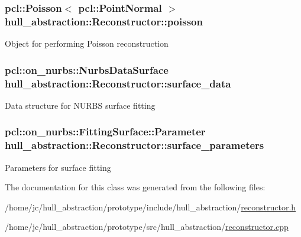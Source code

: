 \subsubsection[{\texorpdfstring{poisson}{poisson}}]{\setlength{\rightskip}{0pt plus 5cm}pcl\+::\+Poisson$<$ pcl\+::\+Point\+Normal $>$ hull\+\_\+abstraction\+::\+Reconstructor\+::poisson\hspace{0.3cm}{\ttfamily [private]}}\hypertarget{classhull__abstraction_1_1_reconstructor_a60dfa765833af8d05f1426be0e96adb0}{}\label{classhull__abstraction_1_1_reconstructor_a60dfa765833af8d05f1426be0e96adb0}
Object for performing Poisson reconstruction 
\subsubsection[{\texorpdfstring{surface\+\_\+data}{surface_data}}]{\setlength{\rightskip}{0pt plus 5cm}pcl\+::on\+\_\+nurbs\+::\+Nurbs\+Data\+Surface hull\+\_\+abstraction\+::\+Reconstructor\+::surface\+\_\+data\hspace{0.3cm}{\ttfamily [private]}}\hypertarget{classhull__abstraction_1_1_reconstructor_a54297518de25118c2c44b5d8b778f65a}{}\label{classhull__abstraction_1_1_reconstructor_a54297518de25118c2c44b5d8b778f65a}
Data structure for N\+U\+R\+BS surface fitting 
\subsubsection[{\texorpdfstring{surface\+\_\+parameters}{surface_parameters}}]{\setlength{\rightskip}{0pt plus 5cm}pcl\+::on\+\_\+nurbs\+::\+Fitting\+Surface\+::\+Parameter hull\+\_\+abstraction\+::\+Reconstructor\+::surface\+\_\+parameters\hspace{0.3cm}{\ttfamily [private]}}\hypertarget{classhull__abstraction_1_1_reconstructor_abae19ea237011f56fa300a2461a3f019}{}\label{classhull__abstraction_1_1_reconstructor_abae19ea237011f56fa300a2461a3f019}
Parameters for surface fitting 

The documentation for this class was generated from the following files\+:\begin{DoxyCompactItemize}
\item 
/home/jc/hull\+\_\+abstraction/prototype/include/hull\+\_\+abstraction/\hyperlink{prototype_2include_2hull__abstraction_2reconstructor_8h}{reconstructor.\+h}\item 
/home/jc/hull\+\_\+abstraction/prototype/src/hull\+\_\+abstraction/\hyperlink{prototype_2src_2hull__abstraction_2reconstructor_8cpp}{reconstructor.\+cpp}\end{DoxyCompactItemize}
